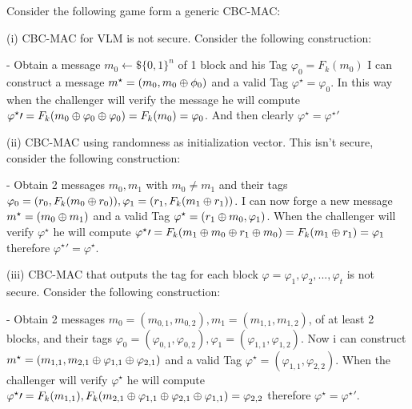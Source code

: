\documentclass[11pt]{article}
\newcounter{t0d0_counter}
\begin{document}
Consider the following game form a generic CBC-MAC:

\begin{figure}[h!]
   \centering
   \sdinit{}
\end{figure}

(i)
CBC-MAC for VLM is not secure. Consider the following construction:

- Obtain a message $m_0\leftarrow\$\{0,1\}^n$ of 1 block and his Tag $\varphi_0 =F_k(m_0)$
I can construct a message $m^\star=(m_0,m_0\oplus \phi_0)$ and a valid Tag $\varphi^\star=\varphi_0$.
In this way when the challenger will verify the message he will compute $\varphi^\star\prime=F_k(m_0\oplus\varphi_0\oplus\varphi_0)=F_k(m_0)=\varphi_0$. 
And then clearly $\varphi^\star=\varphi^\star\prime$

(ii)
CBC-MAC using randomness as initialization vector. This isn't secure, consider the following construction:

- Obtain 2 messages $m_0, m_1$ with $m_0\neq m_1$ and their tags $\varphi_0=(r_0,F_k(m_0\oplus r_0)), \varphi_1=(r_1,F_k(m_1\oplus r_1))$.
I can now forge a new message $m^\star=(m_0\oplus m_1)$ and a valid Tag $\varphi^\star=(r_1\oplus m_0, \varphi_1)$.
When the challenger will verify $\varphi^\star$ he will compute
$\varphi^\star\prime=F_k(m_1\oplus m_0\oplus r_1\oplus m_0)=F_k(m_1\oplus r_1)=\varphi_1$
therefore $\varphi^\star\prime=\varphi^\star$.

(iii) 
CBC-MAC that outputs the tag for each block $\varphi=\varphi_1,\varphi_2,...,\varphi_t$ is not secure. Consider the following construction:

- Obtain 2 messages $m_0=(m_{0,1},m_{0,2}), m_1=(m_{1,1},m_{1,2})$, of at least 2 blocks, and their tags 
$\varphi_0=(\varphi_{0,1},\varphi_{0,2}), \varphi_1=(\varphi_{1,1},\varphi_{1,2})$. Now i can construct 
$m^\star=(m_{1,1}, m_{2,1}\oplus\varphi_{1,1}\oplus\varphi_{2,1})$ and a valid Tag 
$\varphi^\star=(\varphi_{1,1}, \varphi_{2,2})$. When the challenger will verify $\varphi^\star$ he will compute
$\varphi^\star\prime=F_k(m_{1,1}),F_k(m_{2,1}\oplus\varphi_{1,1}\oplus\varphi_{2,1}\oplus\varphi_{1,1})=\varphi_{2,2}$
therefore $\varphi^\star=\varphi^\star\prime$.
\end{document}
